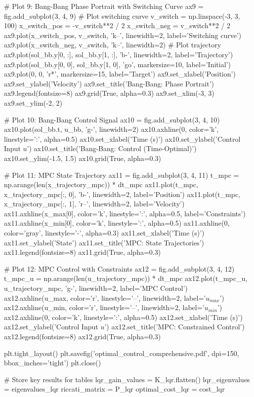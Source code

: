 \documentclass[a4paper, 11pt]{article}
\begin{document}
\begin{pycode}
# Plot 9: Bang-Bang Phase Portrait with Switching Curve
ax9 = fig.add_subplot(3, 4, 9)
# Plot switching curve
v_switch = np.linspace(-3, 3, 100)
x_switch_pos = -v_switch**2 / 2
x_switch_neg = v_switch**2 / 2
ax9.plot(x_switch_pos, v_switch, 'k--', linewidth=2, label='Switching curve')
ax9.plot(x_switch_neg, v_switch, 'k--', linewidth=2)
# Plot trajectory
ax9.plot(sol_bb.y[0, :], sol_bb.y[1, :], 'b-', linewidth=2, label='Trajectory')
ax9.plot(sol_bb.y[0, 0], sol_bb.y[1, 0], 'go', markersize=10, label='Initial')
ax9.plot(0, 0, 'r*', markersize=15, label='Target')
ax9.set_xlabel('Position')
ax9.set_ylabel('Velocity')
ax9.set_title('Bang-Bang: Phase Portrait')
ax9.legend(fontsize=8)
ax9.grid(True, alpha=0.3)
ax9.set_xlim(-3, 3)
ax9.set_ylim(-2, 2)

# Plot 10: Bang-Bang Control Signal
ax10 = fig.add_subplot(3, 4, 10)
ax10.plot(sol_bb.t, u_bb, 'g-', linewidth=2)
ax10.axhline(0, color='k', linestyle=':', alpha=0.5)
ax10.set_xlabel('Time (s)')
ax10.set_ylabel('Control Input $u$')
ax10.set_title('Bang-Bang: Control (Time-Optimal)')
ax10.set_ylim(-1.5, 1.5)
ax10.grid(True, alpha=0.3)

# Plot 11: MPC State Trajectory
ax11 = fig.add_subplot(3, 4, 11)
t_mpc = np.arange(len(x_trajectory_mpc)) * dt_mpc
ax11.plot(t_mpc, x_trajectory_mpc[:, 0], 'b-', linewidth=2, label='Position')
ax11.plot(t_mpc, x_trajectory_mpc[:, 1], 'r--', linewidth=2, label='Velocity')
ax11.axhline(x_max[0], color='k', linestyle=':', alpha=0.5, label='Constraints')
ax11.axhline(x_min[0], color='k', linestyle=':', alpha=0.5)
ax11.axhline(0, color='gray', linestyle='-', alpha=0.3)
ax11.set_xlabel('Time (s)')
ax11.set_ylabel('State')
ax11.set_title('MPC: State Trajectories')
ax11.legend(fontsize=8)
ax11.grid(True, alpha=0.3)

# Plot 12: MPC Control with Constraints
ax12 = fig.add_subplot(3, 4, 12)
t_mpc_u = np.arange(len(u_trajectory_mpc)) * dt_mpc
ax12.plot(t_mpc_u, u_trajectory_mpc, 'g-', linewidth=2, label='MPC Control')
ax12.axhline(u_max, color='r', linestyle='--', linewidth=2, label='$u_{max}$')
ax12.axhline(u_min, color='r', linestyle='--', linewidth=2, label='$u_{min}$')
ax12.axhline(0, color='k', linestyle=':', alpha=0.5)
ax12.set_xlabel('Time (s)')
ax12.set_ylabel('Control Input $u$')
ax12.set_title('MPC: Constrained Control')
ax12.legend(fontsize=8)
ax12.grid(True, alpha=0.3)

plt.tight_layout()
plt.savefig('optimal_control_comprehensive.pdf', dpi=150, bbox_inches='tight')
plt.close()

# Store key results for tables
lqr_gain_values = K_lqr.flatten()
lqr_eigenvalues = eigenvalues_lqr
riccati_matrix = P_lqr
optimal_cost_lqr = cost_lqr
\end{pycode}
\end{document}
